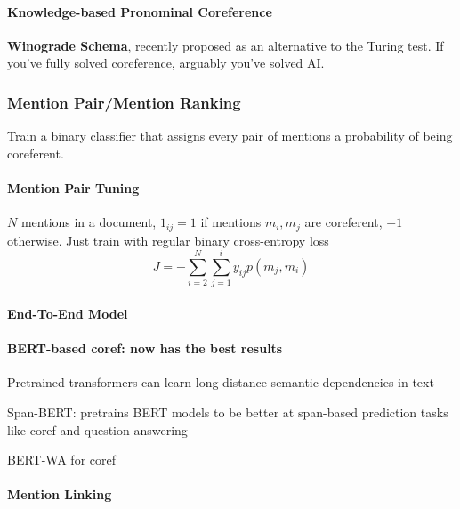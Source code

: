\documentclass[10pt]{report}
\begin{document}
\paragraph{Knowledge-based Pronominal Coreference} %
\textbf{Winograde Schema}, recently proposed as an alternative to the Turing test. If you've fully solved coreference, arguably you've solved AI.
\subsubsection{Mention Pair/Mention Ranking} Train a binary classifier that assigns every pair of mentions a probability of being coreferent.
\paragraph{Mention Pair Tuning} $N$ mentions in a document, $1_{ij}=1$ if mentions $m_i,m_j$ are coreferent, $-1$ otherwise. Just train with regular binary cross-entropy loss
$$J = -\sum_{i=2}^N\sum_{j=1}^i y_{ij}p(m_j,m_i)$$
\paragraph{End-To-End Model} %
\paragraph{BERT-based coref: now has the best results} Pretrained transformers can learn long-distance semantic dependencies in text
\begin{list}{}{}
	\item Span-BERT: pretrains BERT models to be better at span-based prediction tasks like coref and question answering
	\item BERT-WA for coref %
\end{list}
\paragraph{Mention Linking}
\end{document}
